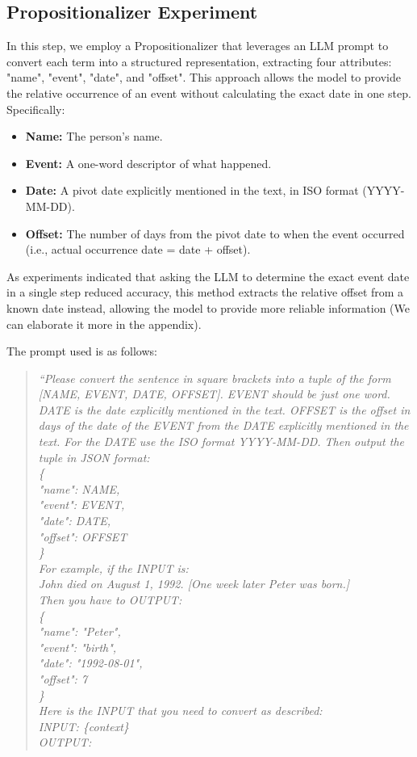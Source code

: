 \documentclass[11pt]{article}
\begin{document}
\subsection{Propositionalizer Experiment}
In this step, we employ a Propositionalizer that leverages an LLM prompt to convert each term into a structured representation, extracting four attributes: "name", "event", "date", and "offset". This approach allows the model to provide the relative occurrence of an event without calculating the exact date in one step. Specifically:
\begin{itemize}
    \item \textbf{Name:} The person’s name.
    \item \textbf{Event:} A one-word descriptor of what happened.
    \item \textbf{Date:} A pivot date explicitly mentioned in the text, in ISO format (YYYY-MM-DD).
    \item \textbf{Offset:} The number of days from the pivot date to when the event occurred (i.e., actual occurrence date = date + offset).
\end{itemize}
As experiments indicated that asking the LLM to determine the exact event date in a single step reduced accuracy, this method extracts the relative offset from a known date instead, allowing the model to provide more reliable information (We can elaborate it more in the appendix).

The prompt used is as follows:
\begin{quote}
\emph{``Please convert the sentence in square brackets into a tuple of the form [NAME, EVENT, DATE, OFFSET]. EVENT should be just one word. DATE is the date explicitly mentioned in the text. OFFSET is the offset in days of the date of the EVENT from the DATE explicitly mentioned in the text. For the DATE use the ISO format YYYY-MM-DD. Then output the tuple in JSON format:\\
\{ \\
"name": NAME, \\
"event": EVENT, \\
"date": DATE, \\
"offset": OFFSET \\
\} \\
For example, if the INPUT is:\\
John died on August 1, 1992. [One week later Peter was born.]\\
Then you have to OUTPUT:\\
\{ \\
"name": "Peter", \\
"event": "birth", \\
"date": "1992-08-01", \\
"offset": 7 \\
\} \\
Here is the INPUT that you need to convert as described: \\
INPUT: \{context\} \\
OUTPUT:}\\
\end{quote}
\end{document}
